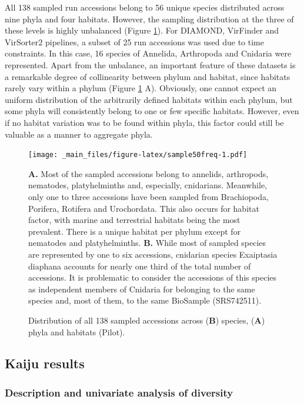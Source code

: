 \documentclass[
  openany]{book}
\begin{document}
All 138 sampled run accessions belong to 56 unique species distributed across nine phyla and four habitats. However, the sampling distribution at the three of these levels is highly unbalanced (Figure \ref{fig:sample50freq}). For DIAMOND, VirFinder and VirSorter2 pipelines, a subset of 25 run accessions was used due to time constraints. In this case, 16 species of Annelida, Arthropoda and Cnidaria were represented. Apart from the unbalance, an important feature of these datasets is a remarkable degree of collinearity between phylum and habitat, since habitats rarely vary within a phylum (Figure \ref{fig:sample50freq} A). Obviously, one cannot expect an uniform distribution of the arbitrarily defined habitats within each phylum, but some phyla will consistently belong to one or few specific habitats. However, even if no habitat variation was to be found within phyla, this factor could still be valuable as a manner to aggregate phyla.

\begin{figure}[!htbp]

\texttt{[image: \_main\_files/figure-latex/sample50freq-1.pdf]}

\caption{Distribution of all 138 sampled accessions across (\textbf{B}) species, (\textbf{A}) phyla and habitats (Pilot). \label{fig:sample50freq}}
\textbf{A.} Most of the sampled accessions belong to annelids, arthropods, nematodes, platyhelminths and, especially, cnidarians. Meanwhile, only one to three accessions have been sampled from Brachiopoda, Porifera, Rotifera and Urochordata. This also occurs for habitat factor, with marine and terrestrial habitats being the most prevalent. There is a unique habitat per phylum except for nematodes and platyhelminths. \textbf{B.} While most of sampled species are represented by one to six accessions, cnidarian species Exaiptasia diaphana accounts for nearly one third of the total number of accessions. It is problematic to consider the accessions of this species as independent members of Cnidaria for belonging to the same species and, most of them, to the same BioSample (SRS742511).

\end{figure}

\hypertarget{kaiju-results}{%
\subsection{Kaiju results}\label{kaiju-results}}

\hypertarget{description-and-univariate-analysis-of-diversity}{%
\subsubsection{Description and univariate analysis of diversity}\label{description-and-univariate-analysis-of-diversity}}
\end{document}
